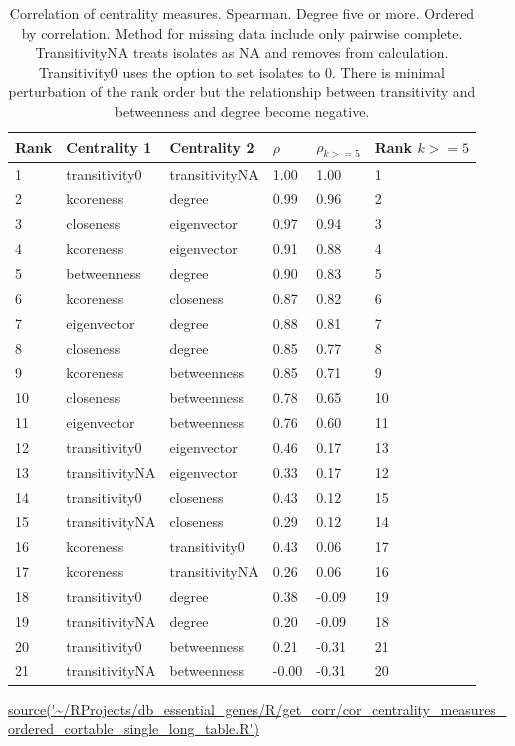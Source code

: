 \begin{table}[ht]
\centering
\begin{tabular}{llllll}
  \hline
Rank  & Centrality 1 & Centrality 2 &$\rho$ & $\rho_{k>=5}$  & Rank $k>=5$ \\ 
  \hline
1 & transitivity0 & transitivityNA & 1.00 & 1.00 & 1 \\ 
  2 & kcoreness & degree & 0.99 & 0.96 & 2 \\ 
  3 & closeness & eigenvector & 0.97 & 0.94 & 3 \\ 
  4 & kcoreness & eigenvector & 0.91 & 0.88 & 4 \\ 
  5 & betweenness & degree & 0.90 & 0.83 & 5 \\ 
  6 & kcoreness & closeness & 0.87 & 0.82 & 6 \\ 
  7 & eigenvector & degree & 0.88 & 0.81 & 7 \\ 
  8 & closeness & degree & 0.85 & 0.77 & 8 \\ 
  9 & kcoreness & betweenness & 0.85 & 0.71 & 9 \\ 
  10 & closeness & betweenness & 0.78 & 0.65 & 10 \\ 
  11 & eigenvector & betweenness & 0.76 & 0.60 & 11 \\ 
  12 & transitivity0 & eigenvector & 0.46 & 0.17 & 13 \\ 
  13 & transitivityNA & eigenvector & 0.33 & 0.17 & 12 \\ 
  14 & transitivity0 & closeness & 0.43 & 0.12 & 15 \\ 
  15 & transitivityNA & closeness & 0.29 & 0.12 & 14 \\ 
  16 & kcoreness & transitivity0 & 0.43 & 0.06 & 17 \\ 
  17 & kcoreness & transitivityNA & 0.26 & 0.06 & 16 \\ 
  18 & transitivity0 & degree & 0.38 & -0.09 & 19 \\ 
  19 & transitivityNA & degree & 0.20 & -0.09 & 18 \\ 
  20 & transitivity0 & betweenness & 0.21 & -0.31 & 21 \\ 
  21 & transitivityNA & betweenness & -0.00 & -0.31 & 20 \\ 
   \hline
\end{tabular}
\caption[Comparison of correlation coefficients for all nodes and nodes with degree greater than or equal to five]{Correlation of centrality measures. Spearman. Degree five or more. Ordered by correlation. Method for missing data include only pairwise complete. TransitivityNA treats isolates as NA and removes from calculation. Transitivity0 uses the option to set isolates to 0. There is minimal perturbation of the rank order but the relationship between transitivity and betweenness and degree become negative.}
\tiny\url{source('~/RProjects/db_essential_genes/R/get_corr/cor_centrality_measures_ordered_cortable_single_long_table.R')}
\label{tab:correlation and rank centrality five or more}
\end{table}

